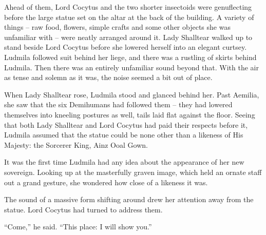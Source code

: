  

Ahead of them, Lord Cocytus and the two shorter insectoids were genuflecting before the large statue set on the altar at the back of the building. A variety of things – raw food, flowers, simple crafts and some other objects she was unfamiliar with – were neatly arranged around it. Lady Shalltear walked up to stand beside Lord Cocytus before she lowered herself into an elegant curtsey. Ludmila followed suit behind her liege, and there was a rustling of skirts behind Ludmila. Then there was an entirely unfamiliar sound beyond that. With the air as tense and solemn as it was, the noise seemed a bit out of place.

 

When Lady Shalltear rose, Ludmila stood and glanced behind her. Past Aemilia, she saw that the six Demihumans had followed them – they had lowered themselves into kneeling postures as well, tails laid flat against the floor. Seeing that both Lady Shalltear and Lord Cocytus had paid their respects before it, Ludmila assumed that the statue could be none other than a likeness of His Majesty: the Sorcerer King, Ainz Ooal Gown.

 

It was the first time Ludmila had any idea about the appearance of her new sovereign. Looking up at the masterfully graven image, which held an ornate staff out a grand gesture, she wondered how close of a likeness it was.

 

The sound of a massive form shifting around drew her attention away from the statue. Lord Cocytus had turned to address them.

 

“Come,” he said. “This place: I will show you.”

